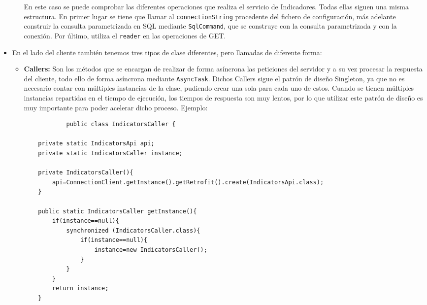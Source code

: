 \begin{itemize}
\begin{itemize}
\begin{lstlisting}
        \end{lstlisting}
        En este caso se puede comprobar las diferentes operaciones que realiza el servicio de Indicadores. Todas ellas siguen una misma estructura. En primer lugar se tiene que llamar al \texttt{connectionString} procedente del fichero de configuración, más adelante construir la consulta parametrizada en SQL mediante \texttt{SqlCommand}, que se construye con la consulta parametrizada y con la conexión. Por último, utiliza el \texttt{reader} en las operaciones de GET.
    \end{itemize}
    \item En el lado del cliente también tenemos tres tipos de clase diferentes, pero llamadas de diferente forma:
    \begin{itemize}
        \item \textbf{Callers: }Son los métodos que se encargan de realizar de
        forma asíncrona las peticiones del servidor y a su vez procesar la
        respuesta del cliente, todo ello de forma asíncrona mediante
        \texttt{AsyncTask}. Dichos Callers sigue el patrón de diseño Singleton,
        ya que no es necesario contar con múltiples instancias de la clase,
        pudiendo crear una sola para cada uno de estos. Cuando se tienen
        múltiples instancias repartidas en el tiempo de ejecución, los tiempos
        de respuesta son muy lentos, por lo que utilizar este patrón de diseño
        es muy importante para poder acelerar dicho proceso. Ejemplo:
        \begin{lstlisting}
            public class IndicatorsCaller {

    private static IndicatorsApi api;
    private static IndicatorsCaller instance;

    private IndicatorsCaller(){
        api=ConnectionClient.getInstance().getRetrofit().create(IndicatorsApi.class);
    }

    public static IndicatorsCaller getInstance(){
        if(instance==null){
            synchronized (IndicatorsCaller.class){
                if(instance==null){
                    instance=new IndicatorsCaller();
                }
            }
        }
        return instance;
    }



\end{lstlisting}
\end{itemize}
\end{itemize}
